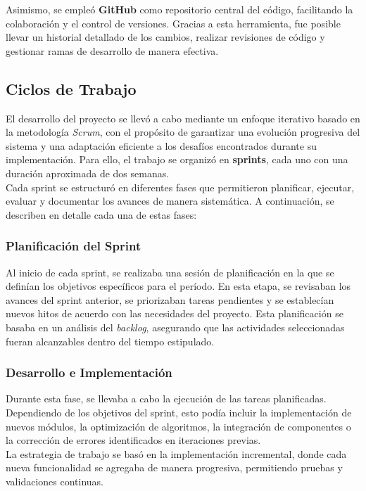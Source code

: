 Asimismo, se empleó \textbf{GitHub} como repositorio central del código, facilitando la colaboración y el control de
versiones.
Gracias a esta herramienta, fue posible llevar un historial detallado de los cambios, realizar revisiones de código y
gestionar ramas de desarrollo de manera efectiva.

\subsection{Ciclos de Trabajo}\label{subsec:ciclos-de-trabajo}
El desarrollo del proyecto se llevó a cabo mediante un enfoque iterativo basado en la metodología \textit{Scrum}, con
el propósito de garantizar una evolución progresiva del sistema y una adaptación eficiente a los desafíos encontrados
durante su implementación.
Para ello, el trabajo se organizó en \textbf{sprints}, cada uno con una duración aproximada de dos semanas.\\[6pt]

Cada sprint se estructuró en diferentes fases que permitieron planificar, ejecutar, evaluar y documentar los avances de
manera sistemática.
A continuación, se describen en detalle cada una de estas fases:

\subsubsection{Planificación del Sprint}
Al inicio de cada sprint, se realizaba una sesión de planificación en la que se definían los objetivos específicos para
el período.
En esta etapa, se revisaban los avances del sprint anterior, se priorizaban tareas pendientes y se establecían nuevos
hitos de acuerdo con las necesidades del proyecto.
Esta planificación se basaba en un análisis del \textit{backlog}, asegurando que las actividades seleccionadas fueran
alcanzables dentro del tiempo estipulado.

\subsubsection{Desarrollo e Implementación}
Durante esta fase, se llevaba a cabo la ejecución de las tareas planificadas.
Dependiendo de los objetivos del sprint, esto podía incluir la implementación de nuevos módulos, la optimización de
algoritmos, la integración de componentes o la corrección de errores identificados en iteraciones previas.\\[6pt]

La estrategia de trabajo se basó en la implementación incremental, donde cada nueva funcionalidad se agregaba de manera
progresiva, permitiendo pruebas y validaciones continuas.


